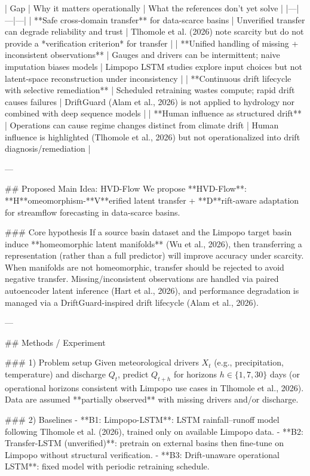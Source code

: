 | Gap | Why it matters operationally | What the references don’t yet solve |
|---|---|---|
| **Safe cross-domain transfer** for data-scarce basins | Unverified transfer can degrade reliability and trust | Tlhomole et al. (2026) note scarcity but do not provide a *verification criterion* for transfer |
| **Unified handling of missing + inconsistent observations** | Gauges and drivers can be intermittent; naive imputation biases models | Limpopo LSTM studies explore input choices but not latent-space reconstruction under inconsistency |
| **Continuous drift lifecycle with selective remediation** | Scheduled retraining wastes compute; rapid drift causes failures | DriftGuard (Alam et al., 2026) is not applied to hydrology nor combined with deep sequence models |
| **Human influence as structured drift** | Operations can cause regime changes distinct from climate drift | Human influence is highlighted (Tlhomole et al., 2026) but not operationalized into drift diagnosis/remediation |

---

## Proposed Main Idea: HVD-Flow  
We propose **HVD-Flow**: **H**omeomorphism-**V**erified latent transfer + **D**rift-aware adaptation for streamflow forecasting in data-scarce basins.

### Core hypothesis  
If a source basin dataset and the Limpopo target basin induce **homeomorphic latent manifolds** (Wu et al., 2026), then transferring a representation (rather than a full predictor) will improve accuracy under scarcity. When manifolds are not homeomorphic, transfer should be rejected to avoid negative transfer. Missing/inconsistent observations are handled via paired autoencoder latent inference (Hart et al., 2026), and performance degradation is managed via a DriftGuard-inspired drift lifecycle (Alam et al., 2026).

---

## Methods / Experiment  

### 1) Problem setup  
Given meteorological drivers \(X_t\) (e.g., precipitation, temperature) and discharge \(Q_t\), predict \(Q_{t+h}\) for horizons \(h \in \{1, 7, 30\}\) days (or operational horizons consistent with Limpopo use cases in Tlhomole et al., 2026). Data are assumed **partially observed** with missing drivers and/or discharge.

### 2) Baselines  
- **B1: Limpopo-LSTM**: LSTM rainfall–runoff model following Tlhomole et al. (2026), trained only on available Limpopo data.  
- **B2: Transfer-LSTM (unverified)**: pretrain on external basins then fine-tune on Limpopo without structural verification.  
- **B3: Drift-unaware operational LSTM**: fixed model with periodic retraining schedule.


